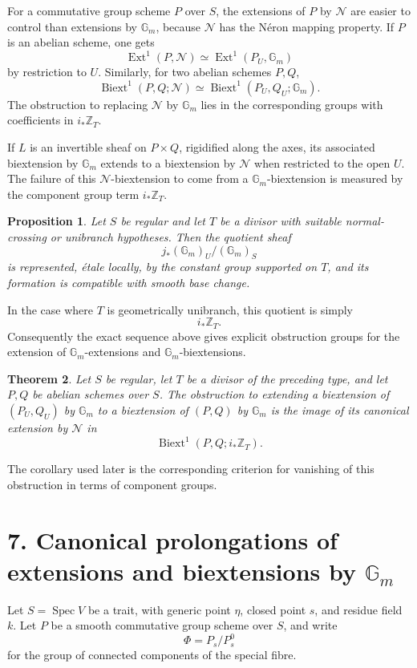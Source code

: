 \documentclass[11pt]{article}
\theoremstyle{plain}
\newtheorem{theorem}{Theorem}[section]
\newtheorem{proposition}[theorem]{Proposition}
\theoremstyle{definition}
\theoremstyle{remark}
\newcommand{\bZ}{\mathbb Z}
\DeclareMathOperator{\Spec}{Spec}
\DeclareMathOperator{\Ext}{Ext}
\DeclareMathOperator{\Biext}{Biext}
\newcommand{\Gm}{\mathbb G_m}
\begin{document}
For a commutative group scheme \(P\) over \(S\), the extensions of \(P\) by
\(\mathcal N\) are easier to control than extensions by \(\Gm\), because
\(\mathcal N\) has the Néron mapping property. If \(P\) is an abelian scheme, one
gets
\[
\Ext^1(P,\mathcal N)\simeq \Ext^1(P_U,\Gm)
\]
by restriction to \(U\). Similarly, for two abelian schemes \(P,Q\),
\[
\Biext^1(P,Q;\mathcal N)\simeq \Biext^1(P_U,Q_U;\Gm).
\]
The obstruction to replacing \(\mathcal N\) by \(\Gm\) lies in the
corresponding groups with coefficients in \(i_*\bZ_T\).

If \(L\) is an invertible sheaf on \(P\times Q\), rigidified along the axes, its
associated biextension by \(\Gm\) extends to a biextension by \(\mathcal N\) when
restricted to the open \(U\). The failure of this \(\mathcal N\)-biextension to
come from a \(\Gm\)-biextension is measured by the component group term
\(i_*\bZ_T\).

\begin{proposition}
Let \(S\) be regular and let \(T\) be a divisor with suitable normal-crossing or
unibranch hypotheses. Then the quotient sheaf
\[
j_*(\Gm)_U/(\Gm)_S
\]
is represented, étale locally, by the constant group supported on \(T\), and its
formation is compatible with smooth base change.
\end{proposition}

In the case where \(T\) is geometrically unibranch, this quotient is simply
\[
i_*\bZ_T.
\]
Consequently the exact sequence above gives explicit obstruction groups for the
extension of \(\Gm\)-extensions and \(\Gm\)-biextensions.

\begin{theorem}
Let \(S\) be regular, let \(T\) be a divisor of the preceding type, and let
\(P,Q\) be abelian schemes over \(S\). The obstruction to extending a
biextension of \((P_U,Q_U)\) by \(\Gm\) to a biextension of \((P,Q)\) by
\(\Gm\) is the image of its canonical extension by \(\mathcal N\) in
\[
\Biext^1(P,Q;i_*\bZ_T).
\]
\end{theorem}

The corollary used later is the corresponding criterion for vanishing of this
obstruction in terms of component groups.

\section*{7. Canonical prolongations of extensions and biextensions by \(\Gm\)}

Let \(S=\Spec V\) be a trait, with generic point \(\eta\), closed point \(s\),
and residue field \(k\). Let \(P\) be a smooth commutative group scheme over
\(S\), and write
\[
\Phi=P_s/P_s^0
\]
for the group of connected components of the special fibre.
\end{document}

